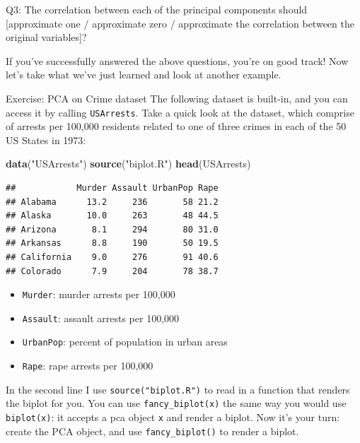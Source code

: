 \documentclass[]{article}
\newenvironment{Shaded}{\begin{snugshade}}{\end{snugshade}}
\newcommand{\KeywordTok}[1]{\textcolor[rgb]{0.13,0.29,0.53}{\textbf{#1}}}
\newcommand{\NormalTok}[1]{#1}
\newcommand{\StringTok}[1]{\textcolor[rgb]{0.31,0.60,0.02}{#1}}
\providecommand{\tightlist}{%
  \setlength{\itemsep}{0pt}\setlength{\parskip}{0pt}}
\begin{document}
Q3: The correlation between each of the principal components should
{[}approximate one / approximate zero / approximate the correlation
between the original variables{]}?

If you've successfully answered the above questions, you're on good
track! Now let's take what we've just learned and look at another
example.

Exercise: PCA on Crime dataset The following dataset is built-in, and
you can access it by calling \texttt{USArrests}. Take a quick look at
the dataset, which comprise of arrests per 100,000 residents related to
one of three crimes in each of the 50 US States in 1973:

\begin{Shaded}
\begin{Highlighting}[]
\KeywordTok{data}\NormalTok{(}\StringTok{"USArrests"}\NormalTok{)}
\KeywordTok{source}\NormalTok{(}\StringTok{"biplot.R"}\NormalTok{)}
\KeywordTok{head}\NormalTok{(USArrests)}
\end{Highlighting}
\end{Shaded}

\begin{verbatim}
##            Murder Assault UrbanPop Rape
## Alabama      13.2     236       58 21.2
## Alaska       10.0     263       48 44.5
## Arizona       8.1     294       80 31.0
## Arkansas      8.8     190       50 19.5
## California    9.0     276       91 40.6
## Colorado      7.9     204       78 38.7
\end{verbatim}

\begin{itemize}
\tightlist
\item
  \texttt{Murder}: murder arrests per 100,000\\
\item
  \texttt{Assault}: assault arrests per 100,000
\item
  \texttt{UrbanPop}: percent of population in urban areas\\
\item
  \texttt{Rape}: rape arrests per 100,000
\end{itemize}

In the second line I use \texttt{source("biplot.R")} to read in a
function that renders the biplot for you. You can use
\texttt{fancy\_biplot(x)} the same way you would use \texttt{biplot(x)}:
it accepts a pca object \texttt{x} and render a biplot. Now it's your
turn: create the PCA object, and use \texttt{fancy\_biplot()} to render
a biplot.
\end{document}
